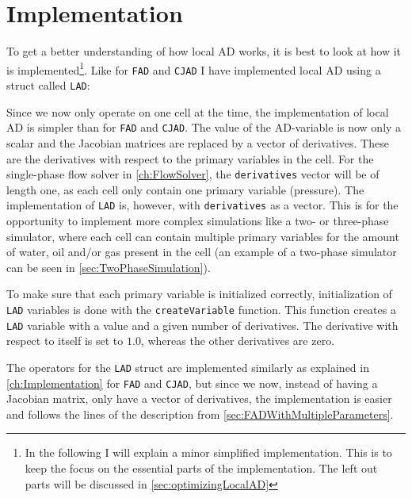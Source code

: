 \section{Implementation}
\label{sec:LADImplementation}
To get a better understanding of how local AD works, it is best to look at how it is implemented\footnote{In the following I will explain a minor simplified implementation. This is to keep the focus on the essential parts of the implementation. The left out parts will be discussed in \autoref{sec:optimizingLocalAD}}. Like for \texttt{FAD} and \texttt{CJAD} I have implemented local AD using a struct called \texttt{LAD}:

Since we now only operate on one cell at the time, the implementation of local AD is simpler than for \texttt{FAD} and \texttt{CJAD}. The value of the AD-variable is now only a scalar and the Jacobian matrices are replaced by a vector of derivatives. These are the derivatives  with respect to the primary variables in the cell. For the single-phase flow solver in \autoref{ch:FlowSolver}, the \texttt{derivatives} vector will be of length one, as each cell only contain one primary variable (pressure). The implementation of \texttt{LAD} is, however, with \texttt{derivatives} as a vector. This is for the opportunity to implement more complex simulations like a two- or three-phase simulator, where each cell can contain multiple primary variables for the amount of water, oil and/or gas present in the cell (an example of a two-phase simulator can be seen in \autoref{sec:TwoPhaseSimulation}).

To make sure that each primary variable is initialized correctly, initialization of \texttt{LAD} variables is done with the \texttt{createVariable} function. This function creates a \texttt{LAD} variable with a value and a given number of derivatives. The derivative with respect to itself is set to $1.0$, whereas the other derivatives are zero.

The operators for the \texttt{LAD} struct are implemented similarly as explained in \autoref{ch:Implementation} for \texttt{FAD} and \texttt{CJAD}, but since we now, instead of having a Jacobian matrix, only have a vector of derivatives, the implementation is easier and follows the lines of the description from \autoref{sec:FADWithMultipleParameters}. 

